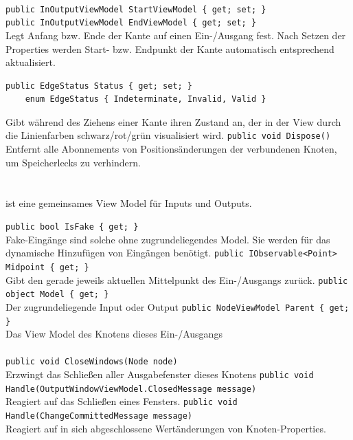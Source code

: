 \paragraph{}
\begin{itemize}
	\add \verb!public InOutputViewModel StartViewModel { get; set; }! \\
	     \verb!public InOutputViewModel EndViewModel { get; set; }! \\
	Legt Anfang bzw. Ende der Kante auf einen Ein-/Ausgang fest. Nach Setzen der Properties werden Start- bzw. Endpunkt der Kante automatisch entsprechend aktualisiert.
	\add \begin{verbatim}public EdgeStatus Status { get; set; }
	enum EdgeStatus { Indeterminate, Invalid, Valid }
	\end{verbatim}
	Gibt während des Ziehens einer Kante ihren Zustand an, der in der View durch die Linienfarben schwarz/rot/grün visualisiert wird.
	\add \verb!public void Dispose()! \\
	Entfernt alle Abonnements von Positionsänderungen der verbundenen Knoten, um Speicherlecks zu verhindern.
\end{itemize}

\paragraph{}~\\
 ist eine gemeinsames View Model für Inputs und Outputs.
\begin{itemize}
	\add \verb!public bool IsFake { get; }! \\
	Fake-Eingänge sind solche ohne zugrundeliegendes Model. Sie werden für das dynamische Hinzufügen von Eingängen benötigt.
	\add \verb!public IObservable<Point> Midpoint { get; }! \\
	Gibt den gerade jeweils aktuellen Mittelpunkt des Ein-/Ausgangs zurück.
	\add \verb!public object Model { get; }! \\
	Der zugrundeliegende Input oder Output
	\add \verb!public NodeViewModel Parent { get; }! \\
	Das View Model des Knotens dieses Ein-/Ausgangs
\end{itemize}

\paragraph{}
\begin{itemize}
	\add \verb!public void CloseWindows(Node node)! \\
	Erzwingt das Schließen aller Ausgabefenster dieses Knotens
	\add \verb!public void Handle(OutputWindowViewModel.ClosedMessage message)! \\
	Reagiert auf das Schließen eines Fensters.
	\verb!public void Handle(ChangeCommittedMessage message)! \\
	Reagiert auf in sich abgeschlossene Wertänderungen von Knoten-Properties.
\end{itemize}


